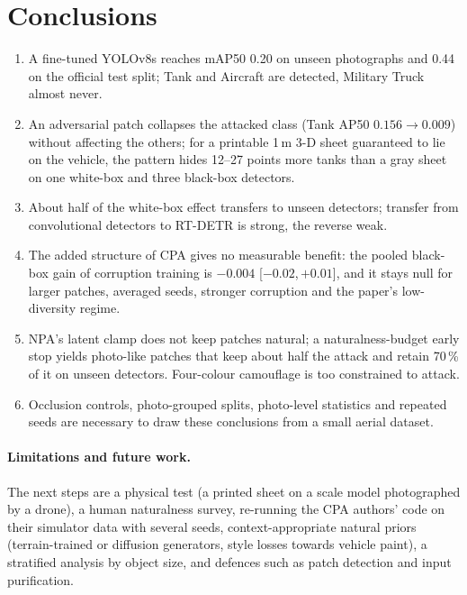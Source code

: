 \documentclass[11pt,a4paper]{article}
\newcommand{\ci}[2]{{\footnotesize[#1,\,#2]}}
\begin{document}
\section{Conclusions}\label{sec:conclusion}
\begin{enumerate}
  \item A fine-tuned YOLOv8s reaches mAP50 0.20 on unseen photographs and 0.44 on the official test split; Tank and Aircraft are detected, Military Truck almost never.
  \item An adversarial patch collapses the attacked class (Tank AP50 $0.156\to0.009$) without affecting the others; for a printable 1\,m 3-D sheet guaranteed to lie on the vehicle, the pattern hides 12--27 points more tanks than a gray sheet on one white-box and three black-box detectors.
  \item About half of the white-box effect transfers to unseen detectors; transfer from convolutional detectors to RT-DETR is strong, the reverse weak.
  \item The added structure of CPA gives no measurable benefit: the pooled black-box gain of corruption training is $-0.004$ \ci{$-0.02$}{$+0.01$}, and it stays null for larger patches, averaged seeds, stronger corruption and the paper's low-diversity regime.
  \item NPA's latent clamp does not keep patches natural; a naturalness-budget early stop yields photo-like patches that keep about half the attack and retain 70\,\% of it on unseen detectors. Four-colour camouflage is too constrained to attack.
  \item Occlusion controls, photo-grouped splits, photo-level statistics and repeated seeds are necessary to draw these conclusions from a small aerial dataset.
\end{enumerate}

\paragraph{Limitations and future work.} The next steps are a physical test (a printed sheet on a scale model photographed by a drone), a human naturalness survey, re-running the CPA authors' code on their simulator data with several seeds, context-appropriate natural priors (terrain-trained or diffusion generators, style losses towards vehicle paint), a stratified analysis by object size, and defences such as patch detection and input purification.
\end{document}
